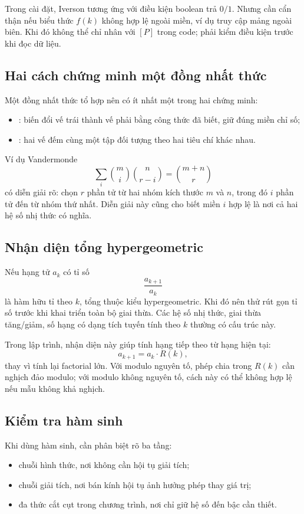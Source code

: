 \documentclass[11pt]{article}
\begin{document}
Trong cài đặt, Iverson tương ứng với điều kiện boolean trả \(0/1\). Nhưng cần
cẩn thận nếu biểu thức \(f(k)\) không hợp lệ ngoài miền, ví dụ truy cập mảng
ngoài biên. Khi đó không thể chỉ nhân với \([P]\) trong code; phải kiểm điều
kiện trước khi đọc dữ liệu.

\subsection{Hai cách chứng minh một đồng nhất thức}

Một đồng nhất thức tổ hợp nên có ít nhất một trong hai chứng minh:
\begin{itemize}
  \item {}: biến đổi vế trái thành vế phải bằng công thức đã biết,
        giữ đúng miền chỉ số;
  \item {}: hai vế đếm cùng một tập đối tượng
        theo hai tiêu chí khác nhau.
\end{itemize}

Ví dụ Vandermonde
\[
  \sum_i \binom{m}{i}\binom{n}{r-i}=\binom{m+n}{r}
\]
có diễn giải rõ: chọn \(r\) phần tử từ hai nhóm kích thước \(m\) và \(n\), trong
đó \(i\) phần tử đến từ nhóm thứ nhất. Diễn giải này cũng cho biết miền \(i\)
hợp lệ là nơi cả hai hệ số nhị thức có nghĩa.

\subsection{Nhận diện tổng hypergeometric}

Nếu hạng tử \(a_k\) có tỉ số
\[
  \frac{a_{k+1}}{a_k}
\]
là hàm hữu tỉ theo \(k\), tổng thuộc kiểu hypergeometric. Khi đó nên thử rút
gọn tỉ số trước khi khai triển toàn bộ giai thừa. Các hệ số nhị thức, giai thừa
tăng/giảm, số hạng có dạng tích tuyến tính theo \(k\) thường có cấu trúc này.

Trong lập trình, nhận diện này giúp tính hạng tiếp theo từ hạng hiện tại:
\[
  a_{k+1}=a_k\cdot R(k),
\]
thay vì tính lại factorial lớn. Với modulo nguyên tố, phép chia trong \(R(k)\)
cần nghịch đảo modulo; với modulo không nguyên tố, cách này có thể không hợp lệ
nếu mẫu không khả nghịch.

\subsection{Kiểm tra hàm sinh}

Khi dùng hàm sinh, cần phân biệt rõ ba tầng:
\begin{itemize}
  \item chuỗi hình thức, nơi không cần hội tụ giải tích;
  \item chuỗi giải tích, nơi bán kính hội tụ ảnh hưởng phép thay giá trị;
  \item đa thức cắt cụt trong chương trình, nơi chỉ giữ hệ số đến bậc cần thiết.
\end{itemize}
\end{document}
